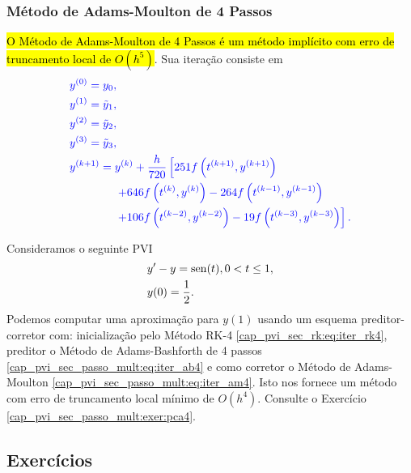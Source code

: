 \subsubsection{Método de Adams-Moulton de 4 Passos}

\hl{O Método de Adams-Moulton de 4 Passos é um método implícito com erro de truncamento local de $O(h^5)$}. Sua iteração consiste em
\begin{equation}\label{cap_pvi_sec_passo_mult:eq:iter_am4}\color{blue}\begin{aligned}
    &y^{(0)} = y_0,\\
    &y^{(1)} = \tilde{y}_1,\\
    &y^{(2)} = \tilde{y}_2,\\
    &y^{(3)} = \tilde{y}_3,\\
    &y^{(k+1)} = y^{(k)} + \frac{h}{720}\left[251f\left(t^{(k+1)},y^{(k+1)}\right) \right.\\
    &\qquad\qquad\left. + 646f\left(t^{(k)},y^{(k)}\right) - 264f\left(t^{(k-1)},y^{(k-1)}\right) \right. \\
    &\qquad\qquad\left. + 106f\left(t^{(k-2)},y^{(k-2)}\right) - 19f\left(t^{(k-3)},y^{(k-3)}\right)\right].
  \end{aligned}
\end{equation}

\begin{ex}
  Consideramos o seguinte PVI
  \begin{subequations}
    \begin{align}
      &y' - y = \operatorname{sen}(t), 0 < t \leq 1,\\
      &y(0) = \frac{1}{2}.
    \end{align}
  \end{subequations}
  Podemos computar uma aproximação para $y(1)$ usando um esquema preditor-corretor com: inicialização pelo Método RK-4 \ref{cap_pvi_sec_rk:eq:iter_rk4}, preditor o Método de Adams-Bashforth de 4 passos \eqref{cap_pvi_sec_passo_mult:eq:iter_ab4} e como corretor o Método de Adams-Moulton \eqref{cap_pvi_sec_passo_mult:eq:iter_am4}. Isto nos fornece um método com erro de truncamento local mínimo de $O(h^4)$. Consulte o Exercício \ref{cap_pvi_sec_passo_mult:exer:pca4}.
\end{ex}

\subsection{Exercícios}

